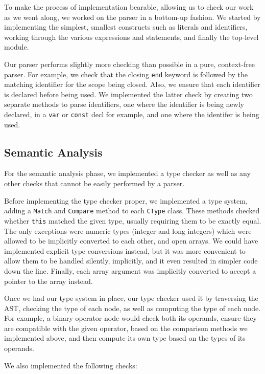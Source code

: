 \documentclass{article}
\begin{document}
To make the process of implementation bearable, allowing us to check our work as
we went along, we worked on the parser in a bottom-up fashion. We started by
implementing the simplest, smallest constructs such as literals and identifiers,
working through the various expressions and statements, and finally the
top-level module.

Our parser performs slightly more checking than possible in a pure, context-free
parser. For example, we check that the closing \texttt{end} keyword is followed
by the matching identifier for the scope being closed. Also, we ensure that each
identifier is declared before being used. We implemented the latter check by
creating two separate methods to parse identifiers, one where the identifier is
being newly declared, in a \texttt{var} or \texttt{const} decl for example,
and one where the identifer is being used.

\subsection{Semantic Analysis}

For the semantic analysis phase, we implemented a type checker as well as any
other checks that cannot be easily performed by a parser.

Before implementing the type checker proper, we implemented a type system,
adding a \texttt{Match} and \texttt{Compare} method to each \texttt{CType}
class. These methods checked whether \texttt{this} matched the given type,
usually requiring them to be exactly equal. The only exceptions were numeric
types (integer and long integers) which were allowed to be implicitly converted
to each other, and open arrays. We could have implemented explicit type
conversions instead, but it was more convenient to allow them to be handled
silently, implicitly, and it even resulted in simpler code down the line.
Finally, each array argument was implicitly converted to accept a pointer to
the array instead.

Once we had our type system in place, our type checker used it by traversing the
AST, checking the type of each node, as well as computing the type of each node.
For example, a binary operator node would check both its operands, ensure they
are compatible with the given operator, based on the comparison methods we
implemented above, and then compute its own type based on the types of its
operands.

We also implemented the following checks:
\end{document}
